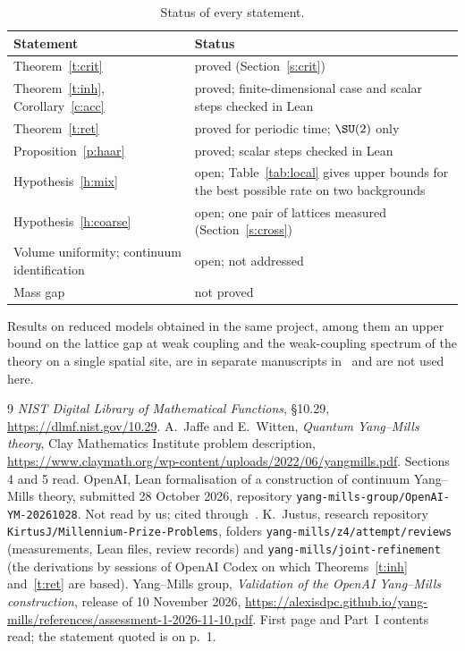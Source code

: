 \begin{table}[ht]
\centering\small
\begin{tabular}{@{}p{}p{}@{}}
\toprule
Statement & Status \\
\midrule
Theorem~\ref{t:crit} & proved (Section~\ref{s:crit}) \\
Theorem~\ref{t:inh}, Corollary~\ref{c:acc} & proved; finite-dimensional case and scalar steps checked in Lean \\
Theorem~\ref{t:ret} & proved for periodic time; $\SU(2)$ only \\
Proposition~\ref{p:haar} & proved; scalar steps checked in Lean \\
Hypothesis~\ref{h:mix} & open; Table~\ref{tab:local} gives upper bounds for the best possible rate on two backgrounds \\
Hypothesis~\ref{h:coarse} & open; one pair of lattices measured (Section~\ref{s:cross}) \\
Volume uniformity; continuum identification & open; not addressed \\
Mass gap & not proved \\
\bottomrule
\end{tabular}
\caption{Status of every statement.}\label{tab:status}
\end{table}

Results on reduced models obtained in the same project, among them an upper bound on the lattice gap at weak
coupling and the weak-coupling spectrum of the theory on a single spatial site, are in separate
manuscripts in~\cite{Repo} and are not used here.

\begin{thebibliography}{9}
 \emph{NIST Digital Library of Mathematical Functions}, \S10.29, \url{https://dlmf.nist.gov/10.29}.
 A.~Jaffe and E.~Witten, \emph{Quantum Yang--Mills theory}, Clay Mathematics Institute problem
description, \url{https://www.claymath.org/wp-content/uploads/2022/06/yangmills.pdf}. Sections 4 and 5 read.
 OpenAI, Lean formalisation of a construction of continuum Yang--Mills theory, submitted
28 October 2026, repository \texttt{yang-mills-group/OpenAI-YM-20261028}. Not read by us; cited through~\cite{YMG}.
 K.~Justus, research repository \texttt{KirtusJ/Millennium-Prize-Problems}, folders
\texttt{yang-mills/z4/attempt/reviews} (measurements, Lean files, review records) and
\texttt{yang-mills/joint-refinement} (the derivations by sessions of OpenAI Codex on which
Theorems~\ref{t:inh} and~\ref{t:ret} are based).
 Yang--Mills group, \emph{Validation of the OpenAI Yang--Mills construction}, release of
10 November 2026, \url{https://alexisdpc.github.io/yang-mills/references/assessment-1-2026-11-10.pdf}. First page
and Part~I contents read; the statement quoted is on p.~1.
\end{thebibliography}


